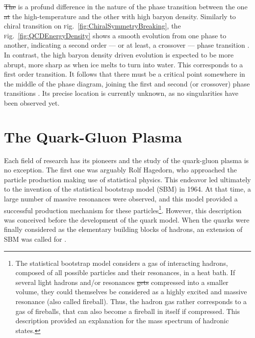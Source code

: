 \documentclass[ALICE,manyauthors]{cernphprep}
\newcommand{\Fig}       {\textsc{f}ig.~}
\newcommand{\fig}       {\Fig}
\providecommand{\DIFaddtex}[1]{{\protect\color{blue}\uwave{#1}}} %
\providecommand{\DIFdeltex}[1]{{\protect\color{red}\sout{#1}}}                      %
\providecommand{\DIFaddbegin}{} %
\providecommand{\DIFaddend}{} %
\providecommand{\DIFdelbegin}{} %
\providecommand{\DIFdelend}{} %
\providecommand{\DIFadd}[1]{\texorpdfstring{\DIFaddtex{#1}}{#1}} %
\providecommand{\DIFdel}[1]{\texorpdfstring{\DIFdeltex{#1}}{}} %
\newcommand{\DIFscaledelfig}{0.5}
\newlength{\DIFdelgraphicswidth} %
\newlength{\DIFdelgraphicsheight} %
\newcommand{\DIFaddincludegraphics}[2][]{{\color{blue}\fbox{\DIFOincludegraphics[#1]{#2}}}} %
\newcommand{\DIFdelincludegraphics}[2][]{%
\sbox{\DIFdelgraphicsbox}{\DIFOincludegraphics[#1]{#2}}%
\settoboxwidth{\DIFdelgraphicswidth}{\DIFdelgraphicsbox} %
\settoboxtotalheight{\DIFdelgraphicsheight}{\DIFdelgraphicsbox} %
\scalebox{\DIFscaledelfig}{%
\parbox[b]{\DIFdelgraphicswidth}{\usebox{\DIFdelgraphicsbox}\\[-\baselineskip] \rule{\DIFdelgraphicswidth}{0em}}\llap{\resizebox{\DIFdelgraphicswidth}{\DIFdelgraphicsheight}{%
\setlength{\unitlength}{\DIFdelgraphicswidth}%
\begin{picture}(1,1)%
\thicklines\linethickness{2pt} %
{\color[rgb]{1,0,0}\put(0,0){\framebox(1,1){}}}%
{\color[rgb]{1,0,0}\put(0,0){\line( 1,1){1}}}%
{\color[rgb]{1,0,0}\put(0,1){\line(1,-1){1}}}%
\end{picture}%
}\hspace*{3pt}}} %
} %
\DeclareRobustCommand{\DIFaddbegin}{\DIFOaddbegin \let\includegraphics\DIFaddincludegraphics} %
\DeclareRobustCommand{\DIFaddend}{\DIFOaddend \let\includegraphics\DIFOincludegraphics} %
\DeclareRobustCommand{\DIFdelbegin}{\DIFOdelbegin \let\includegraphics\DIFdelincludegraphics} %
\DeclareRobustCommand{\DIFdelend}{\DIFOaddend \let\includegraphics\DIFOincludegraphics} %
\begin{document}
\DIFdelbegin \DIFdel{The }\DIFdelend \DIFaddbegin \DIFadd{There }\DIFaddend is a profund difference in the nature of the phase transition between the one \DIFdelbegin \DIFdel{at }\DIFdelend \DIFaddbegin \DIFadd{in }\DIFaddend the high-temperature \DIFaddbegin \DIFadd{region }\DIFaddend and the other with \DIFaddbegin \DIFadd{a }\DIFaddend high baryon density. Similarly to chiral transition on \fig\ref{fig:ChiralSymmetryBreaking}, the \fig\ref{fig:QCDEnergyDensity} shows a smooth evolution from one phase to another, indicating a second order --- or at least, a crossover --- phase transition \cite{philipsenQCDEquationState2013}. In contrast, the high baryon density driven evolution is expected to be more abrupt, more sharp as when ice melts to turn into water. This corresponds to a first order transition. It follows that there must be a critical point somewhere in the middle of the phase diagram, joining the first and second (or crossover) phase transitions \cite{stephanovQCDPhaseDiagram2005}. Its precise location is currently unknown, as no singularities have been observed yet.


\section{The Quark-Gluon Plasma}
\label{sec:QGP}

Each field of research has its pioneers and the study of the quark-gluon plasma is no exception. The first one was arguably Rolf Hagedorn, who approached the particle production making use of statistical physics. This endeavor led ultimately to the invention of the statistical bootstrap model (SBM) in 1964. At that time, a large number of massive resonances were observed, and this model provided a successful production mechanism for these particles\footnote{The statistical bootstrap model considers a gas of interacting hadrons, composed of all possible particles and their resonances, in a heat bath. If several light hadrons and/or resonances \DIFdelbegin \DIFdel{gets }\DIFdelend \DIFaddbegin \DIFadd{get }\DIFaddend compressed into a smaller volume, they could themselves be considered as a highly excited and massive resonance (also called fireball). Thus, the hadron gas rather corresponds to a gas of fireballs, that can also become a fireball in itself if compressed. This description provided an explanation for the mass spectrum of hadronic states.}. However, this description was conceived before the development of the quark model. When the quarks were finally considered as the elementary building blocks of hadrons, an extension of SBM was called for \cite{rafelskiMeltingHadronsBoiling2015a}.
\end{document}
